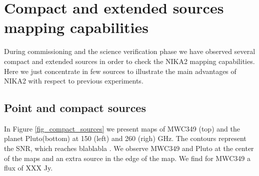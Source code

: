\documentclass[]{aa} %
\begin{document}
\section{Compact and extended sources mapping capabilities}
During commissioning and the science verification phase we have observed several compact and extended sources in order to check the NIKA2 mapping capabilities. Here we just concentrate in few sources to illustrate the main advantages of NIKA2 with respect to previous experiments.

\subsection{Point and compact sources} 
In Figure \ref{fig_compact_sources} we present maps of MWC349 (top) and the planet Pluto(bottom) at 150 (left) and 260 (righ) GHz.
The contours represent the SNR, which reaches blablabla .
We observe MWC349 and Pluto at the center of the maps and an extra source in the edge of the map. We find for MWC349 a flux of XXX Jy.
\end{document}
